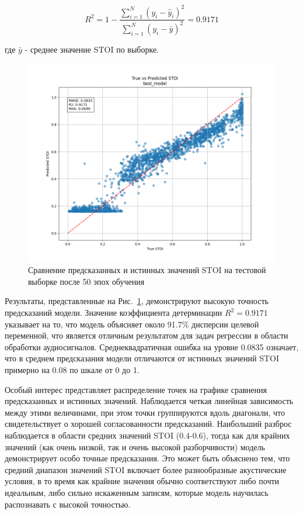 \documentclass[oneside, final, 14pt]{extarticle}
\begin{document}
\begin{equation}
R^2 = 1 - \frac{\sum_{i=1}^N(y_i - \hat{y}_i)^2}{\sum_{i=1}^N(y_i - \bar{y})^2} = 0.9171
\end{equation}

где $\bar{y}$ - среднее значение STOI по выборке.

\begin{figure}[]
\centering
\includegraphics[width=1\linewidth]{best_model_scatter.png}
\caption{Сравнение предсказанных и истинных значений STOI на тестовой выборке после 50 эпох обучения}
\label{fig:stoi_pred}
\end{figure}

Результаты, представленные на Рис.~\ref{fig:stoi_pred}, демонстрируют высокую точность предсказаний модели. Значение коэффициента детерминации $R^2=0.9171$ указывает на то, что модель объясняет около 91.7\% дисперсии целевой переменной, что является отличным результатом для задач регрессии в области обработки аудиосигналов. Среднеквадратичная ошибка на уровне 0.0835 означает, что в среднем предсказания модели отличаются от истинных значений STOI примерно на 0.08 по шкале от 0 до 1.

Особый интерес представляет распределение точек на графике сравнения предсказанных и истинных значений. Наблюдается четкая линейная зависимость между этими величинами, при этом точки группируются вдоль диагонали, что свидетельствует о хорошей согласованности предсказаний. Наибольший разброс наблюдается в области средних значений STOI (0.4-0.6), тогда как для крайних значений (как очень низкой, так и очень высокой разборчивости) модель демонстрирует особо точные предсказания. Это может быть объяснено тем, что средний диапазон значений STOI включает более разнообразные акустические условия, в то время как крайние значения обычно соответствуют либо почти идеальным, либо сильно искаженным записям, которые модель научилась распознавать с высокой точностью.
\end{document}
